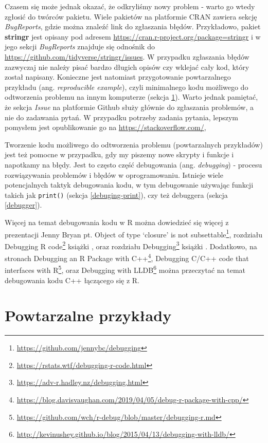 \documentclass[paper=6in:9in,pagesize=pdftex,headinclude=on,footinclude=on,10pt]{scrbook}
\DeclareRobustCommand{\href}[2]{#2\footnote{\url{#1}}}
\begin{document}
Czasem się może jednak okazać, że odkryliśmy nowy problem - warto go wtedy zgłosić do twórców pakietu.
Wiele pakietów na platformie CRAN zawiera sekcję \emph{BugReports}, gdzie można znaleźć link do zgłaszania błędów.
Przykładowo, pakiet \textbf{stringr} jest opisany pod adresem \url{https://cran.r-project.org/package=stringr} i w jego sekcji \emph{BugReports} znajduje się odnośnik do \url{https://github.com/tidyverse/stringr/issues}.
W przypadku zgłaszania błędów zazwyczaj nie należy pisać bardzo długich opisów czy wklejać cały kod, który został napisany.
Konieczne jest natomiast przygotowanie powtarzalnego przykładu (ang. \emph{reproducible example}), czyli minimalnego kodu możliwego do odtworzenia problemu na innym komputerze (sekcja \ref{reprex}).
Warto jednak pamiętać, że sekcja \emph{Issue} na platformie Github służy głównie do zgłaszania problemów, a nie do zadawania pytań.
W przypadku potrzeby zadania pytania, lepszym pomysłem jest opublikowanie go na \url{https://stackoverflow.com/},

Tworzenie kodu możliwego do odtworzenia problemu (powtarzalnych przykładów) jest też pomocne w przypadku, gdy my piszemy nowe skrypty i funkcje i napotkamy na błędy.
Jest to często część debugowania (ang. \emph{debugging}) - procesu rozwiązywania problemów i błędów w oprogramowaniu.
Istnieje wiele potencjalnych taktyk debugowania kodu, w tym debugowanie używając funkcji takich jak \texttt{print()} (sekcja \ref{debuging-print}), czy też debuggera (sekcja \ref{debugger}).

Więcej na temat debugowania kodu w R można dowiedzieć się więcej z prezentacji Jenny Bryan pt. \href{https://github.com/jennybc/debugging}{Object of type `closure' is not subsettable}, \href{https://rstats.wtf/debugging-r-code.html}{rozdziału Debugging R code} książki \citet{rstatswtf}, oraz \href{https://adv-r.hadley.nz/debugging.html}{rozdziału Debugging} książki \citet{wickham2016r}.
Dodatkowo, na stronach \href{https://blog.davisvaughan.com/2019/04/05/debug-r-package-with-cpp/}{Debugging an R Package with C++}, \href{https://github.com/wch/r-debug/blob/master/debugging-r.md}{Debugging C/C++ code that interfaces with R}, oraz \href{http://kevinushey.github.io/blog/2015/04/13/debugging-with-lldb/}{Debugging with LLDB} można przeczytać na temat debugowania kodu C++ łączącego się z R.

\hypertarget{reprex}{%
\section{Powtarzalne przykłady}\label{reprex}}
\end{document}
